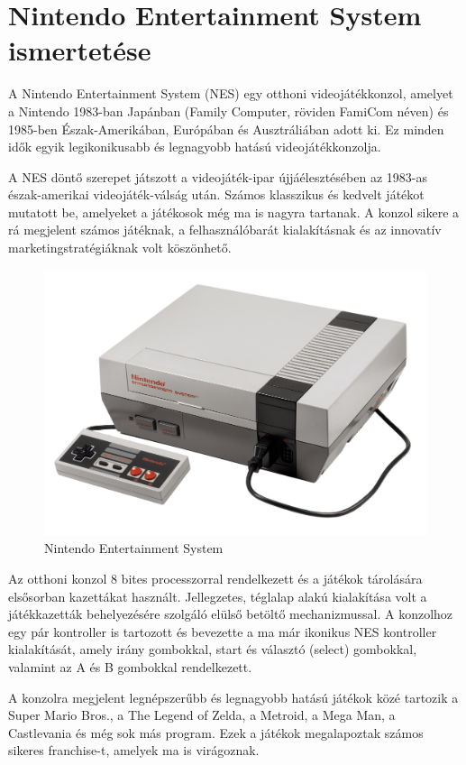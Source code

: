 \chapter{Nintendo Entertainment System ismertetése}

A Nintendo Entertainment System (NES) egy otthoni videojátékkonzol, amelyet a Nintendo 1983-ban Japánban (Family Computer, röviden FamiCom néven) és 1985-ben Észak-Amerikában, Európában és Ausztráliában adott ki. Ez minden idők egyik legikonikusabb és legnagyobb hatású videojátékkonzolja.

A NES döntő szerepet játszott a videojáték-ipar újjáélesztésében az 1983-as észak-amerikai videojáték-válság után. Számos klasszikus és kedvelt játékot mutatott be, amelyeket a játékosok még ma is nagyra tartanak. A konzol sikere a rá megjelent számos játéknak, a felhasználóbarát kialakításnak és az innovatív marketingstratégiáknak volt köszönhető.
\begin{figure}[H]
	\centering
	\includegraphics[width=120mm, keepaspectratio]{figures/NES-console-set}
	\caption{Nintendo Entertainment System \cite{NES_picture}}
	\label{fig:NES-Consol}
\end{figure}

Az otthoni konzol 8 bites processzorral rendelkezett és a játékok tárolására elsősorban kazettákat használt. Jellegzetes, téglalap alakú kialakítása volt a játékkazetták behelyezésére szolgáló elülső betöltő mechanizmussal. A konzolhoz egy pár kontroller is tartozott és bevezette a ma már ikonikus NES kontroller kialakítását, amely irány gombokkal, start és választó (select) gombokkal, valamint az A és B gombokkal rendelkezett.

A konzolra megjelent legnépszerűbb és legnagyobb hatású játékok közé tartozik a Super Mario Bros., a The Legend of Zelda, a Metroid, a Mega Man, a Castlevania és még sok más program. Ezek a játékok megalapoztak számos sikeres franchise-t, amelyek ma is virágoznak.

